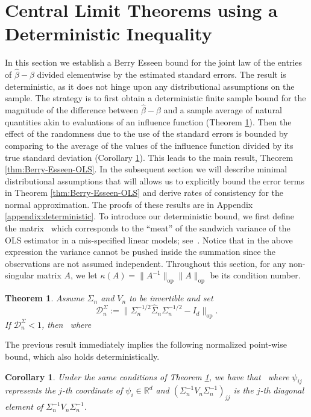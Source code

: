 \documentclass{article}
\let\hat\widehat
\newtheorem{theorem}{Theorem}
\newtheorem{corollary}{Corollary}
\begin{document}
\section{Central Limit Theorems using a Deterministic Inequality}
\label{section::determiniswtic}
In this section
we establish a Berry Esseen bound
for the joint law
of the entries of $\hat\beta-\beta$ divided elementwise by the estimated
standard errors.
The result is deterministic, as it does not hinge upon any distributional
assumptions on the sample.
The strategy is to first obtain a deterministic finite sample bound
for the magnitude of the difference between $\hat\beta-\beta$
and a sample average of natural quantities akin to evaluations of an influence function
(Theorem \ref{thm:Basic-deter-ineq}).
Then the effect of the randomness
due to the use of the standard errors
is bounded
by comparing to the average of the values of the influence function
divided by its true standard deviation
(Corollary \ref{cor:Max-Statistic-Correct-Scaling}).
This leads to the main result,
Theorem \ref{thm:Berry-Esseen-OLS}.
In the subsequent section we will describe minimal distributional assumptions
that will allows us to explicitly bound
the error terms in
Theorem \ref{thm:Berry-Esseen-OLS} and derive rates of consistency for the normal approximation.
The proofs of these results are in Appendix \ref{appendix:deterministic}.
To introduce our deterministic bound, we first define the matrix
\ which corresponds to the ``meat'' of the sandwich variance of the OLS estimator in a mis-specified linear models; see~\cite{Buja14}.
Notice that in the above expression the variance cannot be pushed inside the summation since the observations are not assumed independent. Throughout this section, for any non-singular matrix $A$, we let $\kappa(A) = \|A^{-1}\|_{\mathrm{op}}\|A\|_{\mathrm{op}}$ be its condition number.
\begin{theorem}\label{thm:Basic-deter-ineq}
Assume $\Sigma_n$ and $V_n$ to be invertible and set
\begin{equation}\label{eq:Dn}
\mathcal{D}_n^{\Sigma} := \|\Sigma_n^{-1/2}\widehat{\Sigma}_n\Sigma_n^{-1/2} - I_d\|_{\mathrm{op}}.
\end{equation}
If $\mathcal{D}_n^{\Sigma} < 1$, then
\ where
\ \end{theorem}
The previous
result immediately implies the following normalized point-wise bound, which also holds deterministically.
\begin{corollary}\label{cor:Max-Statistic-Correct-Scaling}
Under the same conditions of Theorem \ref{thm:Basic-deter-ineq}, we have that
\ where $\psi_{ij}$ represents the $j$-th coordinate of $\psi_i\in\mathbb{R}^d$ and $(\Sigma_n^{-1}V_n\Sigma_n^{-1})_{jj}$ is the $j$-th diagonal element of $\Sigma_n^{-1}V_n\Sigma_n^{-1}$.
\end{corollary}
\end{document}

